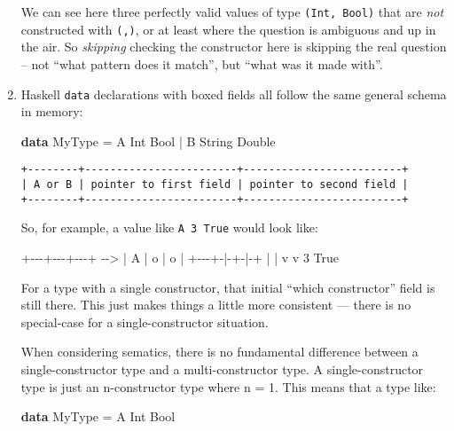\documentclass[]{article}
\newenvironment{Shaded}{}{}
\newcommand{\DataTypeTok}[1]{\textcolor[rgb]{0.56,0.13,0.00}{#1}}
\newcommand{\DecValTok}[1]{\textcolor[rgb]{0.25,0.63,0.44}{#1}}
\newcommand{\KeywordTok}[1]{\textcolor[rgb]{0.00,0.44,0.13}{\textbf{#1}}}
\newcommand{\NormalTok}[1]{#1}
\newcommand{\OperatorTok}[1]{\textcolor[rgb]{0.40,0.40,0.40}{#1}}
\newcommand{\OtherTok}[1]{\textcolor[rgb]{0.00,0.44,0.13}{#1}}
\begin{document}
\begin{enumerate}
  We can see here three perfectly valid values of type \texttt{(Int,\ Bool)}
  that are \emph{not} constructed with \texttt{(,)}, or at least where the
  question is ambiguous and up in the air. So \emph{skipping} checking the
  constructor here is skipping the real question -- not ``what pattern does it
  match'', but ``what was it made with''.
\item
  Haskell \texttt{data} declarations with boxed fields all follow the same
  general schema in memory:

\begin{Shaded}
\begin{Highlighting}[]
\KeywordTok{data} \DataTypeTok{MyType} \OtherTok{=} \DataTypeTok{A} \DataTypeTok{Int} \DataTypeTok{Bool}
            \OperatorTok{|} \DataTypeTok{B} \DataTypeTok{String} \DataTypeTok{Double}
\end{Highlighting}
\end{Shaded}

\begin{verbatim}
+--------+------------------------+-------------------------+
| A or B | pointer to first field | pointer to second field |
+--------+------------------------+-------------------------+
\end{verbatim}

  So, for example, a value like \texttt{A\ 3\ True} would look like:

\begin{Shaded}
\begin{Highlighting}[]
    \OperatorTok{+{-}{-}{-}+{-}{-}{-}+{-}{-}{-}+}
\OperatorTok{{-}{-}>} \OperatorTok{|} \DataTypeTok{A} \OperatorTok{|}\NormalTok{ o }\OperatorTok{|}\NormalTok{ o }\OperatorTok{|}
    \OperatorTok{+{-}{-}{-}+{-}|{-}+{-}|{-}+}
      \OperatorTok{|}   \OperatorTok{|}
\NormalTok{      v   v}
      \DecValTok{3}   \DataTypeTok{True}
\end{Highlighting}
\end{Shaded}

  For a type with a single constructor, that initial ``which constructor'' field
  is still there. This just makes things a little more consistent --- there is
  no special-case for a single-constructor situation.

  When considering sematics, there is no fundamental difference between a
  single-constructor type and a multi-constructor type. A single-constructor
  type is just an n-constructor type where n = 1. This means that a type like:

\begin{Shaded}
\begin{Highlighting}[]
\KeywordTok{data} \DataTypeTok{MyType} \OtherTok{=} \DataTypeTok{A} \DataTypeTok{Int} \DataTypeTok{Bool}
\end{Highlighting}
\end{Shaded}


\end{enumerate}
\end{document}

